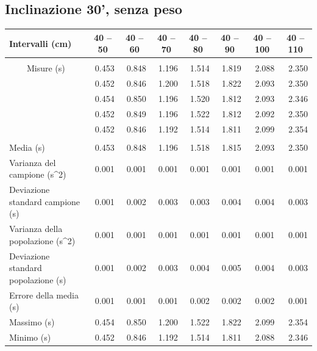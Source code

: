 \documentclass[12pt]{article} %
\begin{document}
	\subsection {Inclinazione 30', senza peso}
		\begin{table}[H]
			\begin{tabular}{|l|r|r|r|r|r|r|r|}
			\hline
			Intervalli (cm) & \multicolumn{1}{c|}{40 – 50} & \multicolumn{1}{c|}{40 – 60} & \multicolumn{1}{c|}{40 – 70} & \multicolumn{1}{c|}{40 – 80 } & \multicolumn{1}{c|}{40 – 90} & \multicolumn{1}{c|}{40 – 100} & \multicolumn{1}{c|}{40 – 110} \\ \hline
			 & \multicolumn{ 7}{l|}{} \\ \hline
			\multicolumn{ 1}{|c|}{Misure (s)} & 0.453 & 0.848 & 1.196 & 1.514 & 1.819 & 2.088 & 2.350 \\ \cline{ 2- 8}
			\multicolumn{ 1}{|l|}{} & 0.452 & 0.846 & 1.200 & 1.518 & 1.822 & 2.093 & 2.350 \\ \cline{ 2- 8}
			\multicolumn{ 1}{|l|}{} & 0.454 & 0.850 & 1.196 & 1.520 & 1.812 & 2.093 & 2.346 \\ \cline{ 2- 8}
			\multicolumn{ 1}{|l|}{} & 0.452 & 0.849 & 1.196 & 1.522 & 1.812 & 2.092 & 2.350 \\ \cline{ 2- 8}
			\multicolumn{ 1}{|l|}{} & 0.452 & 0.846 & 1.192 & 1.514 & 1.811 & 2.099 & 2.354 \\ \hline
			 & \multicolumn{ 7}{c|}{} \\ \hline
			Media (s) & 0.453 & 0.848 & 1.196 & 1.518 & 1.815 & 2.093 & 2.350 \\ \hline
			Varianza del campione (s^2) & 0.001 & 0.001 & 0.001 & 0.001 & 0.001 & 0.001 & 0.001 \\ \hline
			Deviazione standard campione (s) & 0.001 & 0.002 & 0.003 & 0.003 & 0.004 & 0.004 & 0.003 \\ \hline
			Varianza della popolazione (s^2) & 0.001 & 0.001 & 0.001 & 0.001 & 0.001 & 0.001 & 0.001 \\ \hline
			Deviazione standard popolazione (s) & 0.001 & 0.002 & 0.003 & 0.004 & 0.005 & 0.004 & 0.003 \\ \hline
			Errore della media (s) & 0.001 & 0.001 & 0.001 & 0.002 & 0.002 & 0.002 & 0.001 \\ \hline
			Massimo (s) & 0.454 & 0.850 & 1.200 & 1.522 & 1.822 & 2.099 & 2.354 \\ \hline
			Minimo (s) & 0.452 & 0.846 & 1.192 & 1.514 & 1.811 & 2.088 & 2.346 \\ \hline
			\end{tabular}
		\label{30n}
		\end{table}
\end{document}
